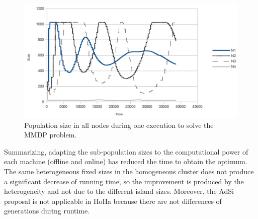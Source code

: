 \begin{figure}
\centering
 \includegraphics[scale =0.4] {gfx/adaptiveresults/sizesMMDP1ejec.pdf}
\caption{Population size in all nodes during one execution to solve
  the MMDP problem.} %
\label{fig:sizesMMDP1ejec}
\end{figure}



\begin{table}
\end{table}



Summarizing, adapting the sub-population sizes to the computational
power of each machine (offline and online) has reduced the time to
obtain the optimum. The same heterogeneous fixed sizes in the
homogeneous cluster does not produce a significant decrease of running
time, so the improvement is produced by the heterogeneity and not due
to the different island sizes. Moreover, the AdSi proposal is not
applicable in HoHa because there are not differences of generations
during runtime. %

